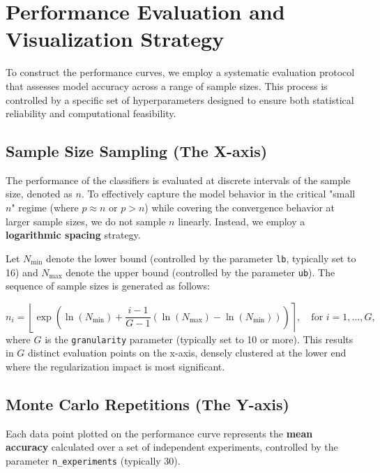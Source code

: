 \documentclass[a4paper,11pt,twoside]{report}
\theoremstyle{definition}
\begin{document}
\section{Performance Evaluation and Visualization Strategy}
\label{sec:visualization_methodology}

To construct the performance curves, we employ a systematic evaluation protocol that assesses model accuracy across a range of sample sizes. This process is controlled by a specific set of hyperparameters designed to ensure both statistical reliability and computational feasibility.

\subsection{Sample Size Sampling (The X-axis)}

The performance of the classifiers is evaluated at discrete intervals of the sample size, denoted as $n$. To effectively capture the model behavior in the critical "small $n$" regime (where $p \approx n$ or $p > n$) while covering the convergence behavior at larger sample sizes, we do not sample $n$ linearly. Instead, we employ a \textbf{logarithmic spacing} strategy.

Let $N_{\min}$ denote the lower bound (controlled by the parameter \texttt{lb}, typically set to 16) and $N_{\max}$ denote the upper bound (controlled by the parameter \texttt{ub}). The sequence of sample sizes is generated as follows:

\begin{equation}
    n_i = \left\lfloor \exp\left( \ln(N_{\min}) + \frac{i-1}{G-1} (\ln(N_{\max}) - \ln(N_{\min})) \right) \right\rceil, \quad \text{for } i = 1, \dots, G,
\end{equation}
where $G$ is the \texttt{granularity} parameter (typically set to 10 or more). This results in $G$ distinct evaluation points on the x-axis, densely clustered at the lower end where the regularization impact is most significant.

\subsection{Monte Carlo Repetitions (The Y-axis)}

Each data point plotted on the performance curve represents the \textbf{mean accuracy} calculated over a set of independent experiments, controlled by the parameter \texttt{n\_experiments} (typically 30).
\end{document}
